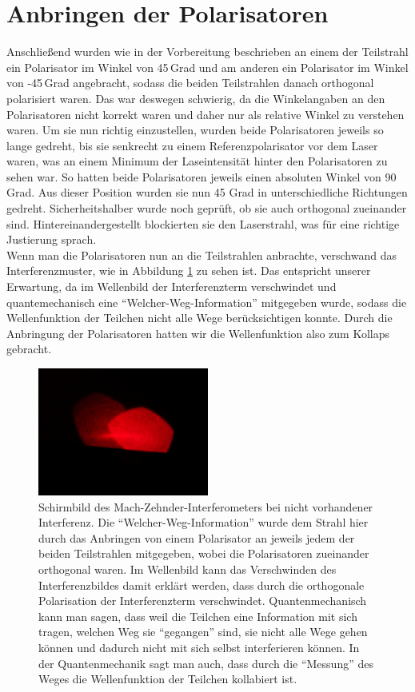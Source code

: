 \documentclass[a4paper,ngerman]{scrartcl}
\begin{document}
\section{Anbringen der Polarisatoren}
Anschließend wurden wie in der Vorbereitung beschrieben an einem der Teilstrahl ein Polarisator im Winkel von 45\,Grad und am anderen 
ein Polarisator im Winkel von -45\,Grad angebracht, sodass die beiden Teilstrahlen danach orthogonal polarisiert waren.
Das war deswegen schwierig, da die Winkelangaben an den Polarisatoren nicht korrekt waren und daher nur als relative Winkel zu verstehen waren.
Um sie nun richtig einzustellen, wurden beide Polarisatoren jeweils so lange gedreht, bis sie senkrecht zu einem Referenzpolarisator vor
dem Laser waren, was an einem Minimum der Laseintensität hinter den Polarisatoren zu sehen war. So hatten beide Polarisatoren jeweils einen absoluten Winkel von 90\,Grad. Aus dieser Position wurden sie nun 45 Grad in unterschiedliche Richtungen gedreht. Sicherheitshalber wurde noch geprüft, ob sie auch orthogonal zueinander sind. Hintereinandergestellt blockierten sie den Laserstrahl, was für eine richtige Justierung sprach.\\

Wenn man die Polarisatoren nun an die Teilstrahlen anbrachte, verschwand das Interferenzmuster, wie in Abbildung \ref{fig:keine_interferenz} zu 
sehen ist. Das entspricht unserer Erwartung, da im Wellenbild der Interferenzterm verschwindet und quantemechanisch eine "`Welcher-Weg-Information"' mitgegeben wurde, sodass die Wellenfunktion der Teilchen nicht alle Wege berücksichtigen konnte. Durch die 
Anbringung der Polarisatoren hatten wir die Wellenfunktion also zum Kollaps gebracht.

\begin{figure}[tbh!]
  \centering
  \includegraphics[width=0.5\textwidth]{fotos/ohne_qr_keineinterferenz.jpg}
  \caption{Schirmbild des Mach-Zehnder-Interferometers bei nicht vorhandener Interferenz. Die "`Welcher-Weg-Information"' wurde dem Strahl hier durch das Anbringen von einem Polarisator an jeweils jedem der beiden Teilstrahlen mitgegeben, wobei die Polarisatoren zueinander orthogonal waren. Im Wellenbild kann das Verschwinden des Interferenzbildes damit erklärt werden, dass durch die orthogonale Polarisation der Interferenzterm verschwindet. Quantenmechanisch kann man sagen, dass weil die Teilchen eine Information mit sich tragen, welchen Weg sie "`gegangen"' sind, sie nicht alle Wege gehen können und dadurch nicht mit sich selbst interferieren können. In der Quantenmechanik sagt man auch, dass durch die "`Messung"' des Weges
die Wellenfunktion der Teilchen kollabiert ist.}
  \label{fig:keine_interferenz}
\end{figure}
\end{document}
